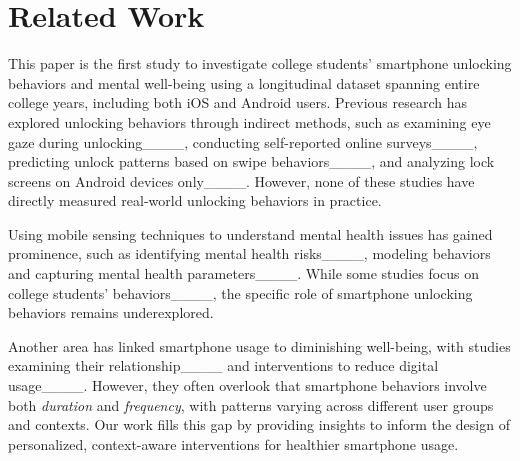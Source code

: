 \section{Related Work}
\label{literature}
\vspace{-2pt}
This paper is the first study to investigate college students' smartphone unlocking behaviors and mental well-being using a longitudinal dataset spanning entire college years, including both iOS and Android users.
Previous research has explored unlocking behaviors through indirect methods, such as examining eye gaze during unlocking____, conducting self-reported online surveys____, predicting unlock patterns based on swipe behaviors____, and analyzing lock screens on Android devices only____. However, none of these studies have directly measured real-world unlocking behaviors in practice.

Using mobile sensing techniques to understand mental health issues has gained prominence, such as identifying mental health risks____, modeling behaviors and capturing mental health parameters____. While some studies focus on college students' behaviors____, the specific role of smartphone unlocking behaviors remains underexplored.



 Another area has linked smartphone usage to diminishing well-being, with studies examining their relationship____ and interventions to reduce digital usage____. 
 However, they often overlook that smartphone behaviors involve both \textit{duration} and \textit{frequency}, with patterns varying across different user groups and contexts. Our work fills this gap by providing insights to inform the design of personalized, context-aware interventions for healthier smartphone usage.


